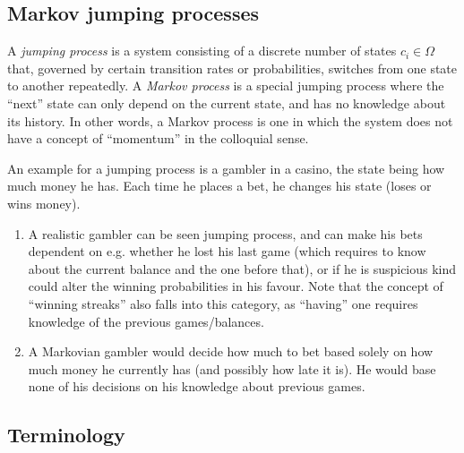 \subsection{Markov jumping processes}
\label{sec:markov process}

A \emph{jumping process} is a system consisting of a discrete number of states \(c_i\in\Omega\) that, governed by certain transition rates or probabilities, switches from one state to another repeatedly. A \emph{Markov process} is a special jumping process where the ``next'' state can only depend on the current state, and has no knowledge about its history. In other words, a Markov process is one in which the system does not have a concept of ``momentum'' in the colloquial sense.

An example for a jumping process is a gambler in a casino, the state being how much money he has. Each time he places a bet, he changes his state (loses or wins money).
%
\begin{enumerate}
	\item A realistic gambler can be seen jumping process, and can make his bets dependent on e.g. whether he lost his last game (which requires to know about the current balance and the one before that), or if he is suspicious kind could alter the winning probabilities in his favour. Note that the concept of ``winning streaks'' also falls into this category, as ``having'' one requires knowledge of the previous games/balances.
	\item A Markovian gambler would decide how much to bet based solely on how much money he currently has (and possibly how late it is). He would base none of his decisions on his knowledge about previous games.
\end{enumerate}






\subsection{Terminology}


